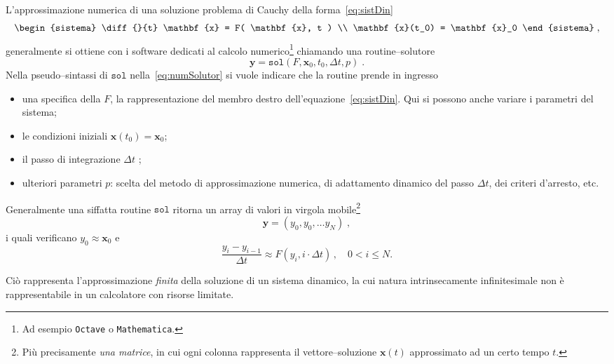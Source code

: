 \paragraph{}
L'approssimazione numerica di una soluzione problema di Cauchy della forma~\eqref{eq:sistDin}
\begin{equation}
\begin{sistema}
\diff{}{t} \mathbf{x} = F( \mathbf{x}, t )  \\
\mathbf{x}(t_0) = \mathbf{x}_0
\end{sistema}
\; ,
\label{eq:probCauchy} %
\end{equation}
generalmente si ottiene con i software dedicati al calcolo numerico\footnote{Ad esempio \texttt{Octave} o
\texttt{Mathematica}.} chiamando una routine--solutore
\begin{equation}
\mathbf{y} = \mathtt{sol} ( F, \mathbf{x}_0, t_0, \Delta t, p) \; .
\label{eq:numSolutor}
\end{equation}
Nella pseudo--sintassi di $\mathtt{sol}$ nella~\eqref{eq:numSolutor} si vuole indicare che la routine prende in ingresso
\begin{itemize}
    \item una specifica della $F$, la rappresentazione del membro destro dell'equazione~\eqref{eq:sistDin}.
        Qui si possono anche variare i parametri del sistema;
    \item le condizioni iniziali $\mathbf{x} (t_0) = \mathbf{x}_0$;
    \item il passo di integrazione $\Delta t$ ;
    \item ulteriori parametri $p$: scelta del metodo di approssimazione numerica, di adattamento dinamico del passo
        $\Delta t$, dei criteri d'arresto, etc.
\end{itemize}
Generalmente una siffatta routine $\mathtt{sol}$ ritorna un array di valori in virgola mobile\footnote{Più
precisamente \emph{una matrice}, in cui ogni colonna rappresenta il vettore--soluzione $\mathbf{x}(t)$ approssimato
ad un certo tempo $t$.}
\begin{equation}
\mathbf{y} = \left( y_0, y_0, \dots y_N \right) \; ,
\label{eq:approxSol}
\end{equation}
i quali verificano $y_0 \approx \mathbf{x}_0$ e
$$\frac{y_i - y_{i-1}}{\Delta t} \approx F \left( y_i, i \cdot \Delta t \right) \, , \quad 0 < i \leq N.$$

Ciò rappresenta l'approssimazione \emph{finita} della soluzione di un sistema dinamico, la cui natura intrinsecamente
infinitesimale non è rappresentabile in un calcolatore con risorse limitate.

